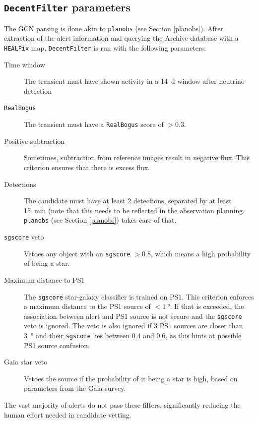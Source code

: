 \documentclass[
    a4paper, %
    fontsize=10pt, %
    twoside=true, %
    numbers=noenddot, %
    fontmethod=tex,
]{kaobook}
\begin{document}
\subsection{\texttt{DecentFilter} parameters}
The GCN parsing is done akin to \texttt{planobs} (see Section \ref{planobs}). After extraction of the alert information and querying the Archive database with a \texttt{HEALPix} map, \texttt{DecentFilter} is run with the following parameters:
\begin{description}
    \item[Time window] The transient must have shown activity in a \SI{14}{\day} window after neutrino detection
    \item[\texttt{RealBogus}] The transient must have a \texttt{RealBogus} score of $>0.3$.
    \item[Positive subtraction] Sometimes, subtraction from reference images result in negative flux. This criterion ensures that there is excess flux.
    \item[Detections] The candidate must have at least 2 detections, separated by at least \SI{15}{\minute} (note that this needs to be reflected in the observation planning. \texttt{planobs} (see Section \ref{planobs}) takes care of that.
    \item[\texttt{sgscore} veto] Vetoes any object with an \texttt{sgscore} $>0.8$, which means a high probability of being a star.
    \item[Maximum distance to PS1] The \texttt{sgscore} star-galaxy classifier is trained on PS1. This criterion enforces a maximum distance to the PS1 source of $<\SI{1}{\degree}$. If that is exceeded, the association between alert and PS1 source is not secure and the \texttt{sgscore} veto is ignored. The veto is also ignored if 3 PS1 sources are closer than \SI{3}{\degree} and their \texttt{sgscore} lies between $0.4$ and $0.6$, as this hints at possible PS1 source confusion.
    \item[Gaia star veto] Vetoes the source if the probability of it being a star is high, based on parameters from the Gaia survey.
\end{description}
The vast majority of alerts do not pass these filters, significantly reducing the human effort needed in candidate vetting. 
\end{document}
